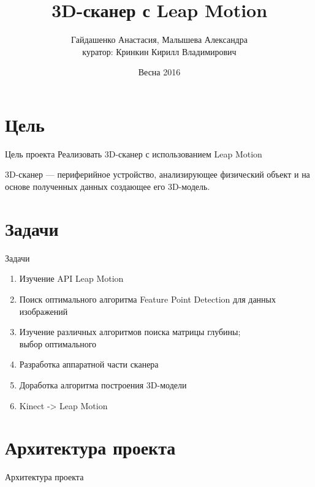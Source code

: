 \documentclass{beamer}
\title[3D-сканер]{3D-сканер с Leap Motion}
\author{Гайдашенко Анастасия, Малышева Александра \\ куратор: Кринкин Кирилл Владимирович}
\institute{СПб АУ РАН}
\date{Весна 2016}
\newcommand{\cimg}[2]{%
	\begin{center}%
		\ifthenelse{\equal{#2}{}}{%
			\texttt{[image: \#1]}
		}{%
			\texttt{[image: \#1]}
		}%
	\end{center}%
}
\begin{document}
\begin{frame}
	\titlepage
\end{frame}

\section{Цель}

\begin{frame}[t]{Цель проекта}
	Реализовать 3D-сканер с использованием Leap Motion
	
	\cimg{01.png}{0.4}

	3D-сканер — периферийное устройство, анализирующее физический объект и на основе полученных данных создающее его 3D-модель.

\end{frame}

\section{Задачи}
\begin{frame}[t]{Задачи}
	\begin{enumerate}
		\item Изучение API Leap Motion
		\item Поиск оптимального алгоритма Feature Point Detection для данных изображений
		\item Изучение различных алгоритмов  поиска матрицы глубины;\\выбор оптимального
		\item Разработка аппаратной части сканера
		\item Доработка алгоритма построения 3D-модели 
		\item Kinect -> Leap Motion
	\end{enumerate}
\end{frame}

\section{Архитектура проекта}
\begin{frame}[t]{Архитектура проекта}
	\cimg{02.png}{0.6}
\end{frame}
\end{document}
